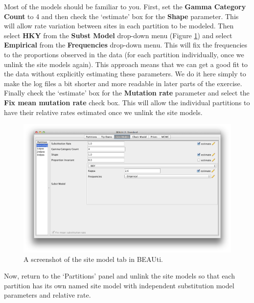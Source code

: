 \documentclass[11pt]{article}
\theoremstyle{plain}%
\theoremstyle{definition}
\theoremstyle{remark}
\begin{document}
Most of the models should be familiar to you. %
First, set the \textbf{Gamma Category Count} to 4 and then check the `estimate' box for the \textbf{Shape} parameter. This will allow rate variation 
between sites in each partition to be modeled.  Then select  \textbf{HKY} from the \textbf{Subst Model} drop-down menu (Figure \ref{fig:BEAUti_Model}) and select \textbf{Empirical} from the \textbf{Frequencies} drop-down menu. This will fix the frequencies to the proportions observed in the data (for each partition individually, once we unlink the site models again). This approach means that we can get a good fit to the data without explicitly estimating these parameters. We do it here simply to make the log files a bit shorter and more readable in later parts of the exercise. Finally check the `estimate' box for the \textbf{Mutation rate} parameter and select the \textbf{Fix mean mutation rate} check box. This will allow the individual partitions to have their relative rates estimated once we unlink the site models.

\begin{figure}
\includegraphics[width=\textwidth]{figures/BEAUti_Model}
\caption{A screenshot of the site model tab in BEAUti.}
\label{fig:BEAUti_Model}
\end{figure}

Now, return to the `Partitions' panel and unlink the site models so that each partition has its own named site model with independent substitution model parameters and relative rate.
\end{document}
